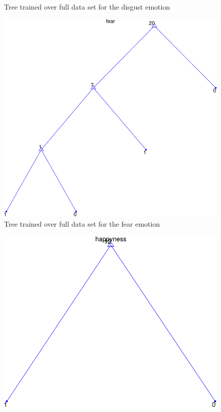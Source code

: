 \documentclass[a4paper]{article}
\begin{document}
\begin{itemize}
\begin{figure}[h]
      \caption{Tree trained over full data set for the disgust emotion}
    \end{figure}
    \begin{figure}[h]
      \centering
      \includegraphics[scale=0.5]{graph-fear}
      \caption{Tree trained over full data set for the fear emotion}
    \end{figure}
    \begin{figure}[h]
      \centering
      \includegraphics[scale=0.5]{graph-happyness}

\end{figure}
\end{itemize}
\end{document}
